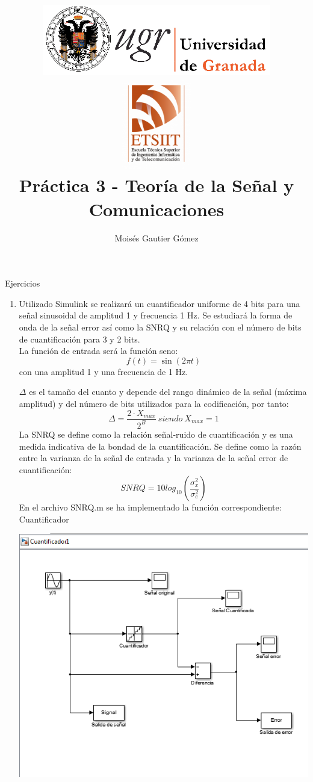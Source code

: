 \documentclass[a4paper,12pt]{article}
\author{Moisés Gautier Gómez}
\title{\includegraphics[width=10cm]{logo_ugr.png} \\ \includegraphics[width=3cm]{fetch.png}\\ Práctica 3 - Teoría de la Señal y Comunicaciones 
}
\date{ }
\begin{document}
\maketitle
Ejercicios
%

\begin{enumerate}
\item Utilizado Simulink se realizará un cuantificador uniforme de 4 bits para una señal sinusoidal de amplitud 1 y frecuencia 1 Hz. Se estudiará la forma de onda de la señal error así como la SNRQ y su relación con el número de bits de cuantificación para 3 y 2 bits. \\

La función de entrada será la función seno:
$$f(t) = \sin(2\pi t)$$
con una amplitud 1 y una frecuencia de 1 Hz.

$\Delta$ es el tamaño del cuanto y depende del rango dinámico de la señal (máxima amplitud) y del número de bits utilizados para la codificación, por tanto:
$$ \Delta = \frac{2 \cdot X_{max}}{2^B}\ siendo\ X_{max} = 1 $$
La SNRQ se define como la relación señal-ruido de cuantificación y es una medida indicativa de la bondad de la cuantificación. Se define como la razón entre la varianza de la señal de entrada y la varianza de la señal error de cuantificación:
$$SNRQ = 10 log_{10}(\frac{\sigma^{2}_{x}}{\sigma^{2}_{e}})$$
En el archivo SNRQ.m se ha implementado la función correspondiente:\\

Cuantificador\\
\begin{center}
\includegraphics[width=.9 \textwidth]{Cuantificador-1.png}

\end{center}
\end{enumerate}
\end{document}
